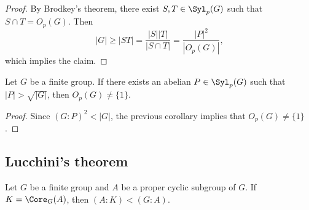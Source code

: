 \begin{proof}
	By Brodkey's theorem, there exist $S,T\in\Syl_p(G)$
	such that $S\cap T=O_p(G)$. Then 
	\[
		|G|\geq |ST|=\frac{|S||T|}{|S\cap T|}=\frac{|P|^2}{|O_p(G)|},
	\]
	which implies the claim. 
\end{proof}

\begin{corollary}
	Let $G$ be a finite group. If there exists an abelian $P\in\Syl_p(G)$ such that 
	$|P|>\sqrt{|G|}$, then $O_p(G)\ne\{1\}$.
\end{corollary}

\begin{proof}
	Since $(G:P)^2<|G|$, the previous corollary implies that 
	$O_p(G)\ne\{1\}$.
\end{proof}




\subsection{Lucchini's theorem}

\begin{theorem}[Lucchini]
	\label{thm:Lucchini}
	Let $G$ be a finite group and $A$ be a proper cyclic subgroup of $G$. If 
	$K=\Core_G(A)$, then $(A:K)<(G:A)$.
\end{theorem}

